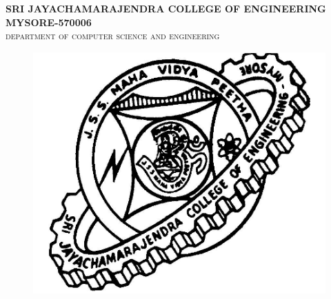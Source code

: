 \documentclass{article}
\begin{document}
\begin{center}
\textbf{SRI JAYACHAMARAJENDRA COLLEGE OF ENGINEERING}
\textbf{MYSORE-570006}\\
\textsc{department of computer science and engineering}\\
\end{center}

\thispagestyle{empty}
\begin{figure}[htb]
\begin{center}
\ifpdf
\includegraphics[scale=0.30]{logo.png}
\else
\fi
\end{center}
\end{figure}
\end{document}
